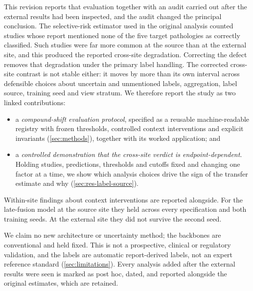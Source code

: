 This revision reports that evaluation together with an audit carried out after
the external results had been inspected, and the audit changed the principal
conclusion. The selective-risk estimator used in the original analysis counted
studies whose report mentioned none of the five target pathologies as
correctly classified. Such studies were far more common at the source than at
the external site, and this produced the reported cross-site degradation.
Correcting the defect removes that degradation under the primary label
handling. The corrected cross-site
contrast is not stable either: it moves by more than its own interval across
defensible choices about uncertain and unmentioned labels, aggregation, label
source, training seed and view stratum. We therefore report the study as two
linked contributions:
\begin{itemize}
  \item a \emph{compound-shift evaluation protocol}, specified as a reusable
        machine-readable registry with frozen thresholds, controlled context
        interventions and explicit invariants (\cref{sec:methods}), together
        with its worked application; and
  \item a \emph{controlled demonstration that the cross-site verdict is
        endpoint-dependent}. Holding studies, predictions, thresholds and
        cutoffs fixed and changing one factor at a time, we show which
        analysis choices drive the sign of the transfer estimate and why
        (\cref{sec:res-label-source}).
\end{itemize}
Within-site findings about context interventions are reported alongside. For
the late-fusion model at the source site they held across every specification
and both training seeds. At the external site they did not survive the second
seed.

We claim no new architecture or uncertainty method; the backbones are
conventional and held fixed. This is not a prospective, clinical or regulatory
validation, and the labels are automatic report-derived labels, not an expert
reference standard (\cref{sec:limitations}). Every analysis added after the
external results were seen is marked as post hoc, dated, and reported
alongside the original estimates, which are retained.

